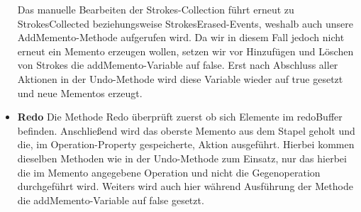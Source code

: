 \begin{itemize}
Das manuelle Bearbeiten der Strokes-Collection führt erneut zu StrokesCollected beziehungsweise StrokesErased-Events, weshalb auch unsere AddMemento-Methode aufgerufen wird. Da wir in diesem Fall jedoch nicht erneut ein Memento erzeugen wollen, setzen wir vor Hinzufügen und Löschen von Strokes die addMemento-Variable auf false. Erst nach Abschluss aller Aktionen in der Undo-Methode wird diese Variable wieder auf true gesetzt und neue Mementos erzeugt. 
\item \textbf{Redo}
Die Methode Redo überprüft zuerst ob sich Elemente im redoBuffer befinden. Anschließend wird das oberste Memento aus dem Stapel geholt und die, im Operation-Property gespeicherte, Aktion ausgeführt. Hierbei kommen dieselben Methoden wie in der Undo-Methode zum Einsatz, nur das hierbei die im Memento angegebene Operation und nicht die Gegenoperation durchgeführt wird. Weiters wird auch hier während Ausführung der Methode die addMemento-Variable auf false gesetzt.
\end{itemize}


